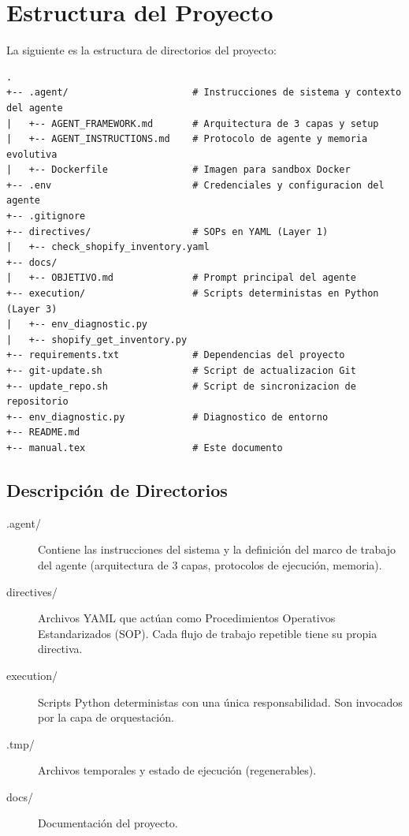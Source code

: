 \documentclass[a4paper,12pt]{article}
\begin{document}
\section{Estructura del Proyecto}

La siguiente es la estructura de directorios del proyecto:

\begin{lstlisting}
.
+-- .agent/                      # Instrucciones de sistema y contexto del agente
|   +-- AGENT_FRAMEWORK.md       # Arquitectura de 3 capas y setup
|   +-- AGENT_INSTRUCTIONS.md    # Protocolo de agente y memoria evolutiva
|   +-- Dockerfile               # Imagen para sandbox Docker
+-- .env                         # Credenciales y configuracion del agente
+-- .gitignore
+-- directives/                  # SOPs en YAML (Layer 1)
|   +-- check_shopify_inventory.yaml
+-- docs/
|   +-- OBJETIVO.md              # Prompt principal del agente
+-- execution/                   # Scripts deterministas en Python (Layer 3)
|   +-- env_diagnostic.py
|   +-- shopify_get_inventory.py
+-- requirements.txt             # Dependencias del proyecto
+-- git-update.sh                # Script de actualizacion Git
+-- update_repo.sh               # Script de sincronizacion de repositorio
+-- env_diagnostic.py            # Diagnostico de entorno
+-- README.md
+-- manual.tex                   # Este documento
\end{lstlisting}

\subsection{Descripción de Directorios}

\begin{description}
    \item[.agent/] Contiene las instrucciones del sistema y la definición del marco de trabajo del agente (arquitectura de 3 capas, protocolos de ejecución, memoria).
    \item[directives/] Archivos YAML que actúan como Procedimientos Operativos Estandarizados (SOP). Cada flujo de trabajo repetible tiene su propia directiva.
    \item[execution/] Scripts Python deterministas con una única responsabilidad. Son invocados por la capa de orquestación.
    \item[.tmp/] Archivos temporales y estado de ejecución (regenerables).
    \item[docs/] Documentación del proyecto.
\end{description}
\end{document}
